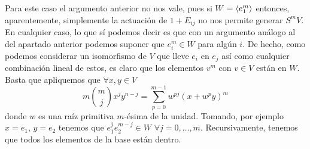 \documentclass[twoside]{article}
\begin{document}
\begin{solucion}
Para este caso el argumento anterior no nos vale, pues si $W=\langle{e_1^m}\rangle$ entonces, aparentemente, simplemente la actuación de $1+E_{ij}$ no nos permite generar $S^m V$. En cualquier caso, lo que sí podemos decir es que con un argumento análogo al del apartado anterior podemos suponer que $e_i^m \in W$ para algún $i$. De hecho, como podemos considerar un isomorfismo de $V$ que lleve $e_i$ en $e_j$ así como cualquier combinación lineal de estos, es claro que los elementos $v^m$ con $v\in V$ están en $W$. Basta que apliquemos que $\forall x,y \in V$
$$
m\binom{m}{j}x^jy^{n-j} = \sum_{p=0}^{m-1}w^{pj}(x+w^py)^m 
$$ 
donde $w$ es una raíz primitiva $m$-ésima de la unidad. Tomando, por ejemplo $x=e_1$, $y=e_2$ tenemos que $e_1^j e_2^{m-j} \in W$ $\forall j=0,\dotsc, m$. Recursivamente, tenemos que todos los elementos de la base están dentro.
\end{solucion}
\end{document}
